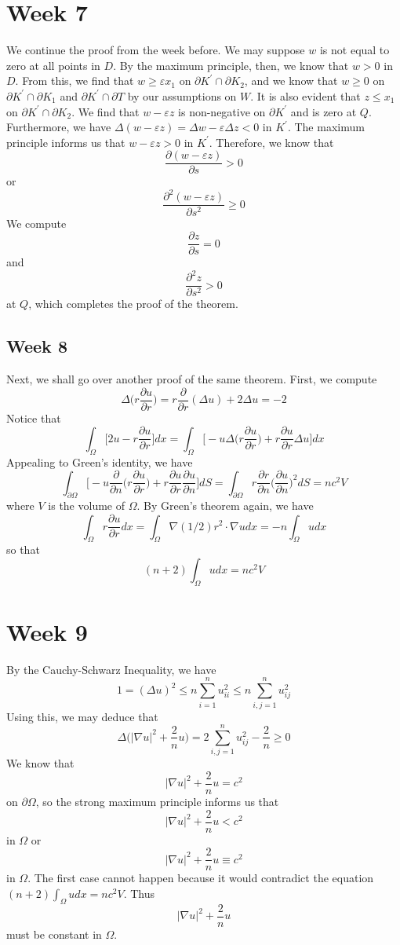 \documentclass[12pt]{article}
\begin{document}
\section*{Week 7}
We continue the proof from the week before. We may suppose $w$ is not equal to zero at all points in $D$. By the maximum principle, then, we know that $w > 0$ in $D$. From this, we find that $w \geq \varepsilon x_1$ on $\partial{K^\prime} \cap \partial{K_2}$, and we know that $w \geq 0$ on $\partial{K^\prime} \cap \partial{K_1}$ and $\partial{K^\prime} \cap \partial{T}$ by our assumptions on $W$. It is also evident that $z \leq x_1$ on $\partial{K^\prime} \cap \partial{K_2}$. We find that $w - \varepsilon z$ is non-negative on $\partial{K^\prime}$ and is zero at $Q$. Furthermore, we have $\Delta(w - \varepsilon z) = \Delta w - \varepsilon \Delta z < 0$ in $K^\prime$. The maximum principle informs us that $w - \varepsilon z > 0$ in $K^\prime$. Therefore, we know that
\[
\frac{\partial{(w- \varepsilon z)}}{\partial{s}} > 0
\] or
\[
\frac{\partial^2(w-\varepsilon z)}{\partial{s}^2} \geq 0
\] We compute
\[
\frac{\partial{z}}{\partial{s}} = 0
\] and
\[
\frac{\partial^2{z}}{\partial{s}^2} > 0
\] at $Q$, which completes the proof of the theorem.
\subsection*{Week 8}
Next, we shall go over another proof of the same theorem. First, we compute
\[
\Delta\bigg(r \frac{\partial{u}}{\partial{r}}\bigg) = r \frac{\partial}{\partial{r}}(\Delta u) + 2\Delta u = -2
\] Notice that
\[
\int_\Omega \bigg[ 2u - r \frac{\partial{u}}{\partial{r}}\bigg] dx = \int_\Omega \bigg[-u \Delta\bigg(r \frac{\partial{u}}{\partial{r}}\bigg) + r \frac{\partial{u}}{\partial{r}} \Delta u \bigg] dx
\] Appealing to Green's identity, we have
\[
\int_{\partial{\Omega}} \bigg[ -u \frac{\partial}{\partial{n}}\bigg( r \frac{\partial{u}}{\partial{r}} \bigg) + r \frac{\partial{u}}{\partial{r}} \frac{\partial{u}}{\partial{n}} \bigg]dS
= \int_{\partial{\Omega}} r\frac{\partial{r}}{\partial{n}} \bigg (\frac{\partial{u}}{\partial{n}}\bigg)^2 dS = n c^2 V
\] where $V$ is the volume of $\Omega$. By Green's theorem again, we have
\[
\int_{\Omega} r \frac{\partial{u}}{\partial{r}} dx = \int_{\Omega} \nabla (1/2)r^2 \cdot \nabla u dx = - n \int_\Omega u dx
\] so that
\[
(n+2) \int_\Omega u dx = nc^2 V
\]
\section*{Week 9}
 By the Cauchy-Schwarz Inequality, we have 
 \[
 1 = (\Delta u)^2 \leq n \sum_{i=1}^n u_{ii}^2 \leq n \sum_{i,j = 1}^n u_{ij}^2
 \] Using this, we may deduce that
 \[
 \Delta \bigg( \vert \nabla u \vert^2 + \frac{2}{n}u \bigg) = 2 \sum_{i,j=1}^n u_{ij}^2 - \frac{2}{n} \geq 0
 \] We know that 
 \[
 \vert \nabla u \vert^2 + \frac{2}{n}u = c^2
 \] on $\partial{\Omega}$, so the strong maximum principle informs us that
 \[
 \vert \nabla u \vert ^2 + \frac{2}{n} u < c^2 
 \] in $\Omega$ or 
 \[
 \vert \nabla u \vert^2 + \frac{2}{n} u \equiv c^2
 \] in $\Omega$. The first case cannot happen because it would contradict the equation $(n+2) \int_\Omega u dx = nc^2 V$. Thus 
 \[
 \vert \nabla u \vert ^2 + \frac{2}{n}u
 \] must be constant in $\Omega$.
\end{document}
